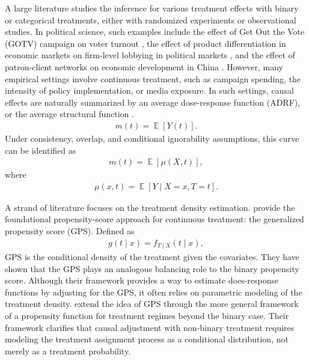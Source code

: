 \documentclass[12pt]{article}
\DeclareMathOperator{\E}{\mathbb{E}}
\theoremstyle{definition}
\begin{document}
A large literature studies the inference for various treatment effects with binary or categorical treatments, either with randomized experiments or observational studies. In political science, such examples include the effect of Get Out the Vote (GOTV) campaign on voter turnout \citep{gerber2000effects}, the effect of product differentiation in economic markets on firm-level lobbying in political markets \citep{kim2017political}, and the effect of patron-client networks on economic development in China \citep{jiang2018making}. However, many empirical settings involve continuous treatment, such as campaign spending, the intensity of policy implementation, or media exposure. In such settings, causal effects are naturally summarized by an average dose-response function (ADRF), or the average structural function \citep{colangelo2026double}.
\begin{align*}
  m(t) = \E \left[  Y(t) \right].
\end{align*}
Under consistency, overlap, and conditional ignorability assumptions, this curve can be identified as 
\begin{align*}
  m(t) = \E \left[ \mu(X, t) \right],
\end{align*}
where
\begin{align*}
  \mu(x, t) = \E \left[ Y \mid X = x, T = t \right].
\end{align*}


A strand of literature focuses on the treatment density estimation. \citet{hirano2004propensity} provide the foundational propensity-score approach for continuous treatment: the generalized propensity score (GPS). Defined as 
\begin{align*}
  g(t \mid x) = f_{T \mid X} (t \mid x),
\end{align*}
GPS is the conditional density of the treatment given the covariates. They have shown that the GPS plays an analogous balancing role to the binary propensity score. Although their framework provides a way to estimate does-response functions by adjusting for the GPS, it often relies on parametric modeling of the treatment density. \citet{imai2004causal} extend the idea of GPS through the more general framework of a propensity function for treatment regimes beyond the binary case. Their framework clarifies that causal adjustment with non-binary treatment requires modeling the treatment assignment process as a conditional distribution, not merely as a treatment probability. 

\end{document}
